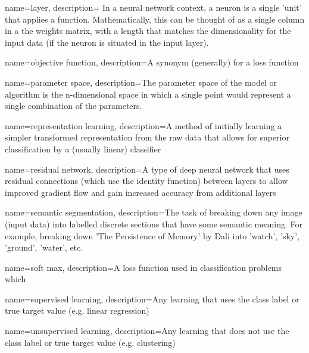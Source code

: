 {
    name=layer,
    description={ In a neural network context, a neuron is a single 'unit' that applies a function. Mathematically, this can be thought of as a single column in a the weights matrix, with a length that matches the dimensionality for the input data (if the neuron is situated in the input layer).  } 
}

{
    name={objective function},
    description={A synonym (generally) for a loss function \cite[p.~80]{good_fellow_2016}}
}

{
    name={parameter space},
    description={The parameter space of the model or algorithm is the n-dimensional space in which a single point would represent a single combination of the parameters.}
}

{
    name=representation learning,
    description={A method of initially learning a simpler transformed representation from the raw data that allows for superior classification by a (usually linear) classifier}
}

{
    name=residual network,
    description={A type of deep neural network that uses residual connections (which use the identity function) between layers to allow improved gradient flow and gain increased accuracy from additional layers}
}

{
    name=semantic segmentation,
    description={The task of breaking down any image (input data) into labelled discrete sections that have some semantic meaning. For example, breaking down 'The Persistence of Memory' by Dali into 'watch', 'sky', 'ground', 'water', etc.}
}

{
    name=soft max,
    description={A loss function used in classification problems which } %
}

{
    name=supervised learning,
    description={Any learning that uses the class label or true target value (e.g. linear regression)}
}

{
    name=unsupervised learning,
    description={Any learning that does not use the class label or true target value (e.g. clustering)}
}

